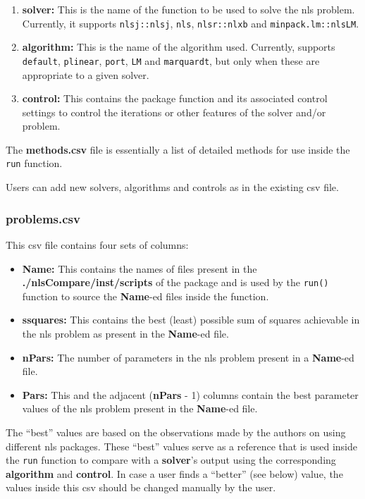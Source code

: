 \begin{enumerate}
\def\labelenumi{\arabic{enumi}.}
\tightlist
\item
  \textbf{solver:} This is the name of the function to be used to solve
  the nls problem. Currently, it supports \texttt{nlsj::nlsj},
  \texttt{nls}, \texttt{nlsr::nlxb} and \texttt{minpack.lm::nlsLM}.
\item
  \textbf{algorithm:} This is the name of the algorithm used. Currently,
  supports \texttt{default}, \texttt{plinear}, \texttt{port},
  \texttt{LM} and \texttt{marquardt}, but only when these are
  appropriate to a given solver.
\item
  \textbf{control:} This contains the package function and its
  associated control settings to control the iterations or other
  features of the solver and/or problem.
\end{enumerate}

The \textbf{methods.csv} file is essentially a list of detailed methods
for use inside the \texttt{run} function.

Users can add new solvers, algorithms and controls as in the existing
csv file.

\hypertarget{problems.csv}{%
\subsubsection{problems.csv}\label{problems.csv}}

This csv file contains four sets of columns:

\begin{itemize}
\tightlist
\item
  \textbf{Name:} This contains the names of files present in the
  \textbf{./nlsCompare/inst/scripts} of the package and is used by the
  \texttt{run()} function to source the \textbf{Name}-ed files inside
  the function.
\item
  \textbf{ssquares:} This contains the best (least) possible sum of
  squares achievable in the nls problem as present in the
  \textbf{Name}-ed file.
\item
  \textbf{nPars:} The number of parameters in the nls problem present in
  a \textbf{Name}-ed file.
\item
  \textbf{Pars:} This and the adjacent (\textbf{nPars} - 1) columns
  contain the best parameter values of the nls problem present in the
  \textbf{Name}-ed file.
\end{itemize}

The ``best'' values are based on the observations made by the authors on
using different nls packages. These ``best'' values serve as a reference
that is used inside the \texttt{run} function to compare with a
\textbf{solver}'s output using the corresponding \textbf{algorithm} and
\textbf{control}. In case a user finds a ``better'' (see below) value,
the values inside this csv should be changed manually by the user.

